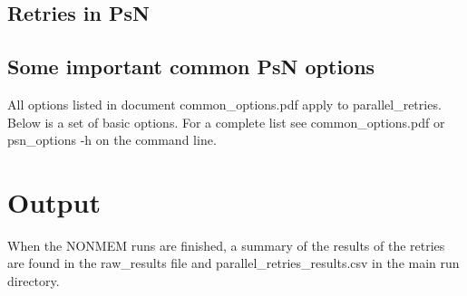 \subsection{Retries in PsN}


\subsection{Some important common PsN options}
All options listed in document common\_options.pdf apply to parallel\_retries. Below is a set of basic options. For a complete list see common\_options.pdf or psn\_options -h on the command line.


\section{Output}
When the NONMEM runs are finished, a summary of the results of the retries are found in the raw\_results file and parallel\_retries\_results.csv in the main run directory.


